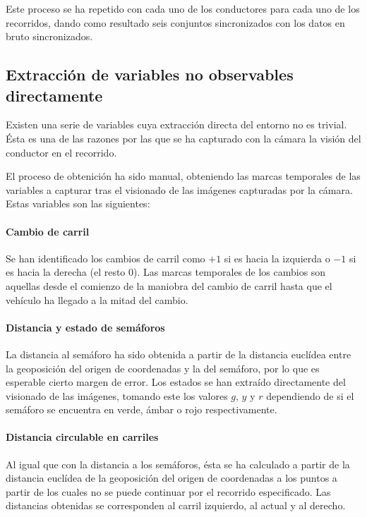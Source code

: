 Este proceso se ha repetido con cada uno de los conductores para cada uno de los recorridos, dando como resultado seis conjuntos sincronizados con los datos en bruto sincronizados.

\subsection{Extracción de variables no observables directamente}

Existen una serie de variables cuya extracción directa del entorno no es trivial. Ésta es una de las razones por las que se ha capturado con la cámara la visión del conductor en el recorrido.

El proceso de obtenición ha sido manual, obteniendo las marcas temporales de las variables a capturar tras el visionado de las imágenes capturadas por la cámara. Estas variables son las siguientes:

\paragraph{Cambio de carril}

Se han identificado los cambios de carril como $+1$ si es hacia la izquierda o $-1$ si es hacia la derecha (el resto $0$). Las marcas temporales de los cambios son aquellas desde el comienzo de la maniobra del cambio de carril hasta que el vehículo ha llegado a la mitad del cambio.

\paragraph{Distancia y estado de semáforos}

La distancia al semáforo ha sido obtenida a partir de la distancia euclídea entre la geoposición del origen de coordenadas y la del semáforo, por lo que es esperable cierto margen de error. Los estados se han extraído directamente del visionado de las imágenes, tomando este los valores $g$, $y$ y $r$ dependiendo de si el semáforo se encuentra en verde, ámbar o rojo respectivamente.

\paragraph{Distancia circulable en carriles}

Al igual que con la distancia a los semáforos, ésta se ha calculado a partir de la distancia euclídea de la geoposición del origen de coordenadas a los puntos a partir de los cuales no se puede continuar por el recorrido especificado. Las distancias obtenidas se corresponden al carril izquierdo, al actual y al derecho.

